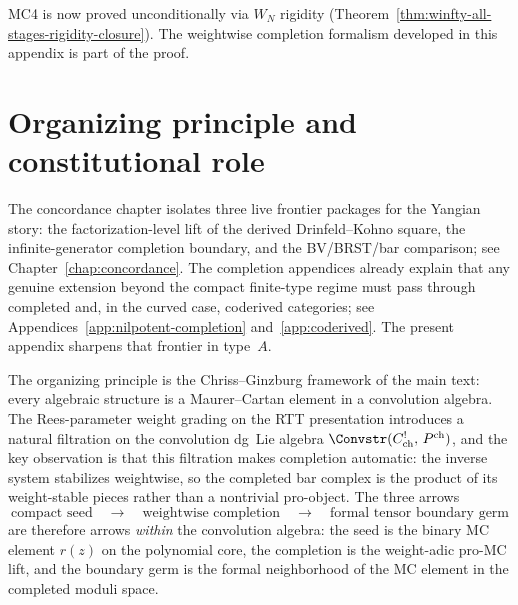 \begin{remark}
MC4 is now proved unconditionally via $W_N$ rigidity
(Theorem~\ref{thm:winfty-all-stages-rigidity-closure}).  The weightwise
completion formalism developed in this appendix is part of the proof.
\end{remark}

\section{Organizing principle and constitutional role}
\label{sec:typeA-organizing-principle}

The concordance chapter isolates three live frontier packages for the
Yangian story: the factorization-level lift of the derived
Drinfeld--Kohno square, the infinite-generator completion boundary, and
the BV/BRST/bar comparison; see Chapter~\ref{chap:concordance}.  The
completion appendices already explain that any genuine extension beyond
the compact finite-type regime must pass through completed and, in the
curved case, coderived categories; see
Appendices~\ref{app:nilpotent-completion} and~\ref{app:coderived}.
The present appendix sharpens that frontier in type~$A$.

The organizing principle is the Chriss--Ginzburg framework of the main
text: every algebraic structure is a Maurer--Cartan element in a
convolution algebra.  The Rees-parameter weight grading on the RTT
presentation introduces a natural filtration on the convolution dg~Lie
algebra $\Convstr(C^!_{\mathrm{ch}},\, P^{\mathrm{ch}})$, and the key
observation is that this filtration makes completion automatic: the
inverse system stabilizes weightwise, so the completed bar complex is
the product of its weight-stable pieces rather than a nontrivial
pro-object.  The three arrows
\begin{equation}
\text{compact seed} \quad \longrightarrow \quad
\text{weightwise completion} \quad \longrightarrow \quad
\text{formal tensor boundary germ}
\end{equation}
are therefore arrows \emph{within} the convolution algebra: the seed is
the binary MC element $r(z)$ on the polynomial core, the completion is
the weight-adic pro-MC lift, and the boundary germ is the formal
neighborhood of the MC element in the completed moduli space.

